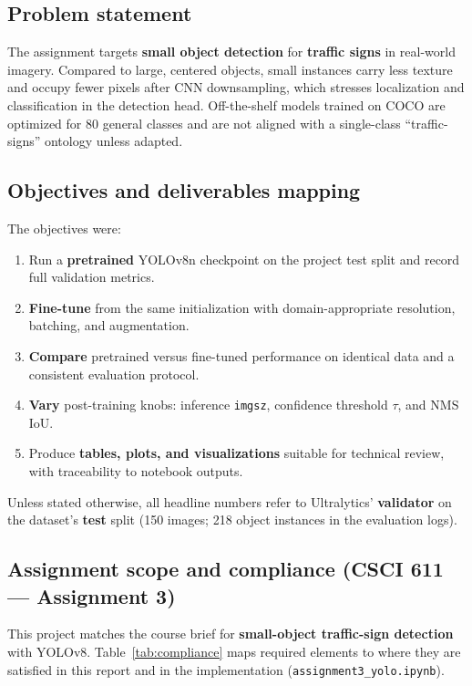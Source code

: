 \documentclass[11pt,a4paper]{article}
\begin{document}
\subsection{Problem statement}
The assignment targets \textbf{small object detection} for \textbf{traffic signs} in real-world imagery. Compared to large, centered objects, small instances carry less texture and occupy fewer pixels after CNN downsampling, which stresses localization and classification in the detection head. Off-the-shelf models trained on COCO are optimized for \num{80} general classes and are not aligned with a single-class ``traffic-signs'' ontology unless adapted.

\subsection{Objectives and deliverables mapping}
The objectives were:
\begin{enumerate}[leftmargin=*]
  \item Run a \textbf{pretrained} YOLOv8n checkpoint on the project test split and record full validation metrics.
  \item \textbf{Fine-tune} from the same initialization with domain-appropriate resolution, batching, and augmentation.
  \item \textbf{Compare} pretrained versus fine-tuned performance on identical data and a consistent evaluation protocol.
  \item \textbf{Vary} post-training knobs: inference \texttt{imgsz}, confidence threshold $\tau$, and NMS IoU.
  \item Produce \textbf{tables, plots, and visualizations} suitable for technical review, with traceability to notebook outputs.
\end{enumerate}

Unless stated otherwise, all headline numbers refer to Ultralytics' \textbf{validator} on the dataset's \textbf{test} split (\num{150} images; \num{218} object instances in the evaluation logs).

\subsection{Assignment scope and compliance (CSCI 611 --- Assignment 3)}
This project matches the course brief for \textbf{small-object traffic-sign detection} with YOLOv8. Table~\ref{tab:compliance} maps required elements to where they are satisfied in this report and in the implementation (\texttt{assignment3\_yolo.ipynb}).
\end{document}
